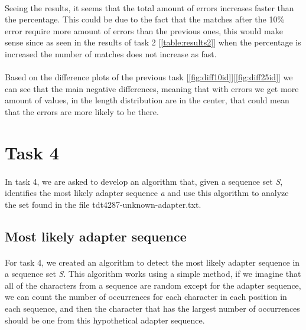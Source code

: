 \documentclass[a4paper,10pt]{article}
\begin{document}
\paragraph{} Seeing the results, it seems that the total amount of errors increases faster than the percentage. This could be due to the fact that the matches after the 10\% error require more amount of errors than the previous ones, this would make sense since as seen in the results of task 2 [\ref{table:results2}] when the percentage is increased the number of matches does not increase as fast.

\paragraph{} Based on the difference plots of the previous task [\ref{fig:diff10id}][\ref{fig:diff25id}] we can see that the main negative differences, meaning that with errors we get more amount of values, in the length distribution are in the center, that could mean that the errors are more likely to be there.

\newpage

\section{Task 4}

\paragraph{} In task 4, we are asked to develop an algorithm that, given a sequence set \textit{S}, identifies the most likely adapter sequence \textit{a} and use this algorithm to analyze the set found in the file tdt4287-unknown-adapter.txt.

\subsection{Most likely adapter sequence}

\paragraph{} For task 4, we created an algorithm to detect the most likely adapter sequence in a sequence set \textit{S}. This algorithm works using a simple method, if we imagine that all of the characters from a sequence are random except for the adapter sequence, we can count the number of occurrences for each character in each position in each sequence, and then the character that has the largest number of occurrences should be one from this hypothetical adapter sequence.
\end{document}

